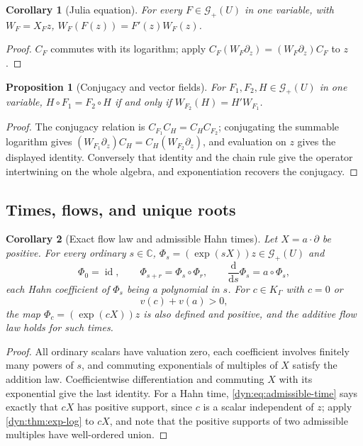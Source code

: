 \documentclass[11pt,letterpaper]{article}
\newtheorem{proposition}[proposition]{Proposition}
\newtheorem{corollary}[corollary]{Corollary}
\theoremstyle{definition}
\theoremstyle{remark}
\newcommand{\C}{\mathbb C}
\newcommand{\GG}{\mathscr G}
\newcommand{\id}{\operatorname{id}}
\numberwithin{equation}{section}
\begin{document}
\begin{corollary}[Julia equation]\label{dyn:cor:julia}
For every $F\in\GG_+(U)$ in one variable, with $W_F=X_Fz$,
$W_F(F(z))=F'(z)W_F(z)$.
\end{corollary}
\begin{proof}
$C_F$ commutes with its logarithm; apply
$C_F(W_F\partial_z)=(W_F\partial_z)C_F$ to $z$.
\end{proof}

\begin{proposition}[Conjugacy and vector fields]\label{dyn:prop:intertwine}
For $F_1,F_2,H\in\GG_+(U)$ in one variable,
$H\circ F_1=F_2\circ H$ if and only if $W_{F_2}(H)=H'W_{F_1}$.
\end{proposition}
\begin{proof}
The conjugacy relation is $C_{F_1}C_H=C_HC_{F_2}$; conjugating the summable
logarithm gives $(W_{F_1}\partial_z)C_H=C_H(W_{F_2}\partial_z)$, and
evaluation on $z$ gives the displayed identity. Conversely that identity
and the chain rule give the operator intertwining on the whole algebra, and
exponentiation recovers the conjugacy.
\end{proof}

\subsection{Times, flows, and unique roots}

\begin{corollary}[Exact flow law and admissible Hahn times]\label{dyn:cor:flow}
Let $X=a\cdot\partial$ be positive. For every ordinary $s\in\C$,
$\Phi_s=(\exp(sX))z\in\GG_+(U)$ and
\begin{equation}\label{dyn:eq:flow-law}
 \Phi_0=\id,\qquad\Phi_{s+r}=\Phi_s\circ\Phi_r,\qquad
 \frac{\mathrm d}{\mathrm ds}\Phi_s=a\circ\Phi_s,
\end{equation}
each Hahn coefficient of $\Phi_s$ being a \emph{polynomial} in $s$. For
$c\in K_\Gamma$ with $c=0$ or
\begin{equation}\label{dyn:eq:admissible-time}
 v(c)+v(a)>0,
\end{equation}
the map $\Phi_c=(\exp(cX))z$ is also defined and positive, and the additive
flow law holds for such times.
\end{corollary}
\begin{proof}
All ordinary scalars have valuation zero, each coefficient involves
finitely many powers of $s$, and commuting exponentials of multiples of
$X$ satisfy the addition law. Coefficientwise differentiation and
commuting $X$ with its exponential give the last identity. For a Hahn time,
\eqref{dyn:eq:admissible-time} says exactly that $cX$ has positive support,
since $c$ is a scalar independent of $z$; apply \cref{dyn:thm:exp-log} to
$cX$, and note that the positive supports of two admissible multiples have
well-ordered union.
\end{proof}
\end{document}
